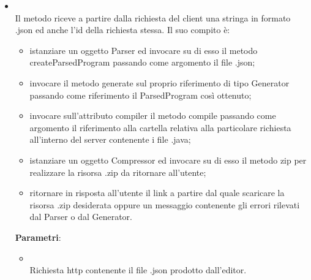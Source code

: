 \begin{itemize}
\begin{itemize}
\item {}
\\ Il metodo riceve a partire dalla richiesta del client una stringa in formato .json ed anche l'id della richiesta stessa.
Il suo compito è:
\begin{itemize}
\item istanziare un oggetto Parser ed invocare su di esso il metodo createParsedProgram passando come argomento il file .json;
\item invocare il metodo generate sul proprio riferimento di tipo Generator passando come riferimento il ParsedProgram così ottenuto;
\item invocare sull'attributo compiler il metodo compile passando come argomento il riferimento alla cartella relativa alla particolare richiesta all'interno del server contenente i file .java;
\item istanziare un oggetto Compressor ed invocare su di esso il metodo zip per realizzare la risorsa .zip da ritornare all'utente;
\item ritornare in risposta all'utente il link a partire dal quale scaricare la risorsa .zip desiderata oppure un messaggio contenente gli errori rilevati dal Parser o dal Generator.
\end{itemize}
 \textbf{Parametri}:
\begin{itemize}
\item {}
\\ Richiesta http contenente il file .json prodotto dall'editor.
\end{itemize}
\end{itemize}
\end{itemize}
\subsection{}
\label{\nogloxy{swedesigner::server::generator}}
